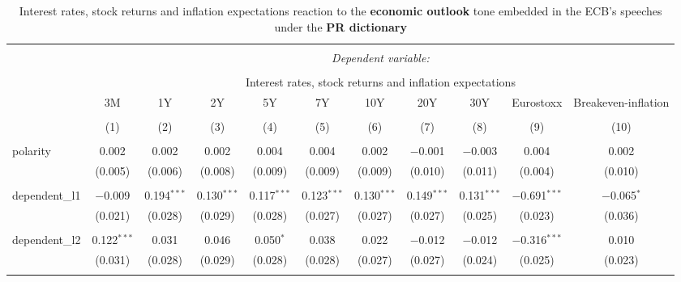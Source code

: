 
\begin{table}[!htbp] \centering 
  \caption [PR Economic Outlook Tone \& Interest Rates, Stock Returns, Inflation Expectations: all speeches]{Interest rates, stock returns and inflation expectations reaction to the \textbf{economic outlook} tone embedded in the ECB's speeches under the \textbf{PR dictionary}} 
  \label{tab:assets_all_pr_ec} 
  \begin{adjustbox}{width=1.25\textwidth}
\begin{tabular}{@{\extracolsep{5pt}}lcccccccccc} 
\\[-1.8ex]\hline 
\hline \\[-1.8ex] 
 & \multicolumn{10}{c}{\textit{Dependent variable:}} \\ 
\cline{2-11} 
\\[-1.8ex] & \multicolumn{10}{c}{Interest rates, stock returns and inflation expectations} \\ 
 & 3M & 1Y & 2Y & 5Y & 7Y & 10Y & 20Y & 30Y & Eurostoxx & Breakeven-inflation \\ 
\\[-1.8ex] & (1) & (2) & (3) & (4) & (5) & (6) & (7) & (8) & (9) & (10)\\ 
\hline \\[-1.8ex] 
 polarity & 0.002 & 0.002 & 0.002 & 0.004 & 0.004 & 0.002 & $-$0.001 & $-$0.003 & 0.004 & 0.002 \\ 
  & (0.005) & (0.006) & (0.008) & (0.009) & (0.009) & (0.009) & (0.010) & (0.011) & (0.004) & (0.010) \\ 
  & & & & & & & & & & \\ 
 dependent\_l1 & $-$0.009 & 0.194$^{***}$ & 0.130$^{***}$ & 0.117$^{***}$ & 0.123$^{***}$ & 0.130$^{***}$ & 0.149$^{***}$ & 0.131$^{***}$ & $-$0.691$^{***}$ & $-$0.065$^{*}$ \\ 
  & (0.021) & (0.028) & (0.029) & (0.028) & (0.027) & (0.027) & (0.027) & (0.025) & (0.023) & (0.036) \\ 
  & & & & & & & & & & \\ 
 dependent\_l2 & 0.122$^{***}$ & 0.031 & 0.046 & 0.050$^{*}$ & 0.038 & 0.022 & $-$0.012 & $-$0.012 & $-$0.316$^{***}$ & 0.010 \\ 
  & (0.031) & (0.028) & (0.029) & (0.028) & (0.028) & (0.027) & (0.027) & (0.024) & (0.025) & (0.023) \\ 
  & & & & & & & & & & \\ 

\end{tabular}
\end{adjustbox}
\end{table}
